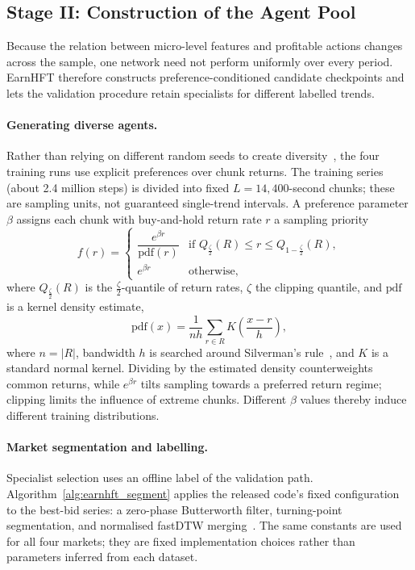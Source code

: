 \subsection{Stage II: Construction of the Agent Pool}
\label{sec:earnhft_stage2}

Because the relation between micro-level features and profitable actions changes across the sample, one network need not perform uniformly over every period. EarnHFT therefore constructs preference-conditioned candidate checkpoints and lets the validation procedure retain specialists for different labelled trends.

\paragraph{Generating diverse agents.} Rather than relying on different random seeds to create diversity~\cite{sun2023mastering}, the four training runs use explicit preferences over chunk returns. The training series (about 2.4 million steps) is divided into fixed $L=14{,}400$-second chunks; these are sampling units, not guaranteed single-trend intervals. A preference parameter $\beta$ assigns each chunk with buy-and-hold return rate $r$ a sampling priority
\begin{equation}
\label{eq:earnhft_pes}
f(r) =
\begin{cases}
\dfrac{e^{\beta r}}{\mathrm{pdf}(r)} & \text{if } Q_{\frac{\zeta}{2}}(R) \le r \le Q_{1-\frac{\zeta}{2}}(R),\\[2mm]
e^{\beta r} & \text{otherwise},
\end{cases}
\end{equation}
where $Q_{\frac{\zeta}{2}}(R)$ is the $\frac{\zeta}{2}$-quantile of return rates, $\zeta$ the clipping quantile, and $\mathrm{pdf}$ is a kernel density estimate,
\begin{equation}
\label{eq:earnhft_kernel}
\mathrm{pdf}(x)=\frac{1}{nh}\sum_{r\in R} K\!\left(\frac{x-r}{h}\right),
\end{equation}
where $n=|R|$, bandwidth $h$ is searched around Silverman's rule~\cite{silverman1986density}, and $K$ is a standard normal kernel. Dividing by the estimated density counterweights common returns, while $e^{\beta r}$ tilts sampling towards a preferred return regime; clipping limits the influence of extreme chunks. Different $\beta$ values thereby induce different training distributions.

\paragraph{Market segmentation and labelling.} Specialist selection uses an offline label of the validation path. Algorithm~\ref{alg:earnhft_segment} applies the released code's fixed configuration to the best-bid series: a zero-phase Butterworth filter, turning-point segmentation, and normalised fastDTW merging~\cite{sakoe1978dtw,berndt1994dtw}. The same constants are used for all four markets; they are fixed implementation choices rather than parameters inferred from each dataset.


